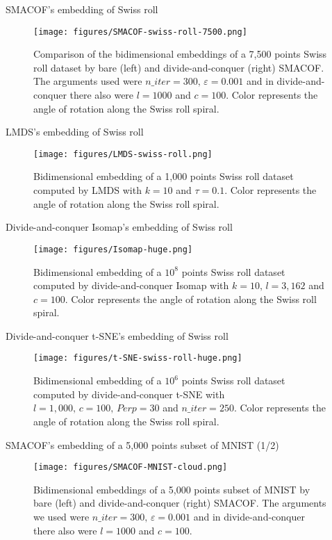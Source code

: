 \documentclass[10pt]{beamer}
\begin{document}
\begin{frame}{SMACOF's embedding of Swiss roll}
\begin{figure}
    \centering
    \texttt{[image: figures/SMACOF-swiss-roll-7500.png]}
    \caption{Comparison of the bidimensional embeddings of a 7,500 points Swiss roll dataset by bare (left) and divide-and-conquer (right) SMACOF. The arguments used were $n\_iter = 300,\, \varepsilon = 0.001$ and in divide-and-conquer there also were $l=1000$ and $c=100$. Color represents the angle of rotation along the Swiss roll spiral.}
    \label{fig:SMACOF-swiss-roll-7500}
\end{figure}
\end{frame}
\begin{frame}{LMDS's embedding of Swiss roll}
\begin{figure}
    \centering
    \texttt{[image: figures/LMDS-swiss-roll.png]}
    \caption{Bidimensional embedding of a 1,000 points Swiss roll dataset computed by LMDS with $k=10$ and $\tau = 0.1$. Color represents the angle of rotation along the Swiss roll spiral.}
    \label{fig:LMDS-swiss-roll}
\end{figure}
\end{frame}
\begin{frame}{Divide-and-conquer Isomap's embedding of Swiss roll}
    \begin{figure}
    \centering
    \texttt{[image: figures/Isomap-huge.png]}
    \caption{Bidimensional embedding of a \alert{$10^8$ points} Swiss roll dataset computed by divide-and-conquer Isomap with $k=10, \, l=3,162$ and $c=100$. Color represents the angle of rotation along the Swiss roll spiral.}
    \label{fig:Isomap-huge}
\end{figure}
\end{frame}
\begin{frame}{Divide-and-conquer t-SNE's embedding of Swiss roll}
\begin{figure}
    \centering
    \texttt{[image: figures/t-SNE-swiss-roll-huge.png]}
    \caption{Bidimensional embedding of a \alert{$10^6$} points Swiss roll dataset computed by divide-and-conquer t-SNE with $l=1,000, \, c=100, \, Perp=30$ and $n\_iter=250$. Color represents the angle of rotation along the Swiss roll spiral.}
    \label{fig:t-SNE-huge}
\end{figure}
\end{frame}

\begin{frame}{SMACOF's embedding of a 5,000 points subset of MNIST (1/2)}
    \begin{figure}
        \centering
        \texttt{[image: figures/SMACOF-MNIST-cloud.png]}
    \caption{Bidimensional embeddings of a 5,000 points subset of MNIST by bare (left) and divide-and-conquer (right) SMACOF. The arguments we used were $n\_iter = 300,\, \varepsilon = 0.001$ and in divide-and-conquer there also were $l=1000$ and $c=100$.}
        \label{fig:SMACOF-MNIST-cloud}
    \end{figure}
\end{frame}
\end{document}
